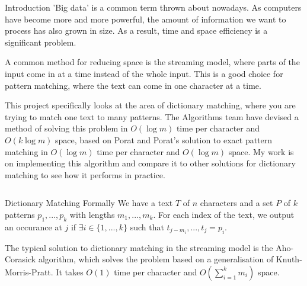 \documentclass[ %
                    author={Dominic Moylett},
                supervisor={Dr. Raphael Clifford and Dr. Benjamin Sach},
                    degree={MEng},
                     title={Dictionary Matching with Fingerprints},
                  subtitle={},
                      type={research},
                      year={2015} ]{poster}
\newcommand{\nline}{
  \\\vspace{\baselineskip}
}
\begin{document}

\begin{frame}{} 

\vfill

\begin{columns}[t]
  \begin{column}{0.900\linewidth}
  \begin{block}{\Large Introduction}
  'Big data' is a common term thrown about nowadays. As computers have become more and more powerful, the amount of information we want to process has also grown in size. As a result, time and space efficiency is a significant problem.\nline

  A common method for reducing space is the streaming model, where parts of the input come in at a time instead of the whole input. This is a good choice for pattern matching, where the text can come in one character at a time.\nline

  This project specifically looks at the area of dictionary matching, where you are trying to match one text to many patterns. The Algorithms team have devised a method of solving this problem in $O(\log m)$ time per character and $O(k\log m)$ space, based on Porat and Porat's solution to exact pattern matching in $O(\log m)$ time per character and $O(\log m)$ space. My work is on implementing this algorithm and compare it to other solutions for dictionary matching to see how it performs in practice.
  \end{block}
  \end{column}
\end{columns}

\vfill

\begin{columns}[t]
  \begin{column}{0.422\linewidth}
  \begin{block}{\Large Dictionary Matching Formally}
  We have a text $T$ of $n$ characters and a set $P$ of $k$ patterns $p_1,...,p_k$ with lengths $m_1,...,m_k$. For each index of the text, we output an occurance at $j$ if $\exists i \in \{1,...,k\}$ such that $t_{j - m_i},...,t_j = p_i$.\nline

  The typical solution to dictionary matching in the streaming model is the Aho-Corasick algorithm, which solves the problem based on a generalisation of Knuth-Morris-Pratt. It takes $O(1)$ time per character and $O(\sum_{i =1}^km_i)$ space.
  \end{block}
  \end{column}


\end{columns}
\end{frame}
\end{document}
